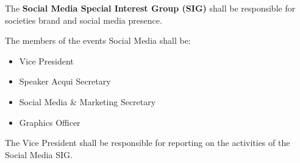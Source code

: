 \begin{clause}
    The \textbf{Social Media Special Interest Group (SIG)} shall be responsible for societies brand and social media presence.
\end{clause}

\begin{subclause}
    The members of the events Social Media shall be:
    \begin{itemize}[label=--,topsep=0em,itemsep=0em]
        \item Vice President
        \item Speaker Acqui Secretary
        \item Social Media \& Marketing Secretary
        \item Graphics Officer
    \end{itemize}
\end{subclause}

\begin{subclause}
    The Vice President shall be responsible for reporting on the activities of the Social Media SIG.
\end{subclause}